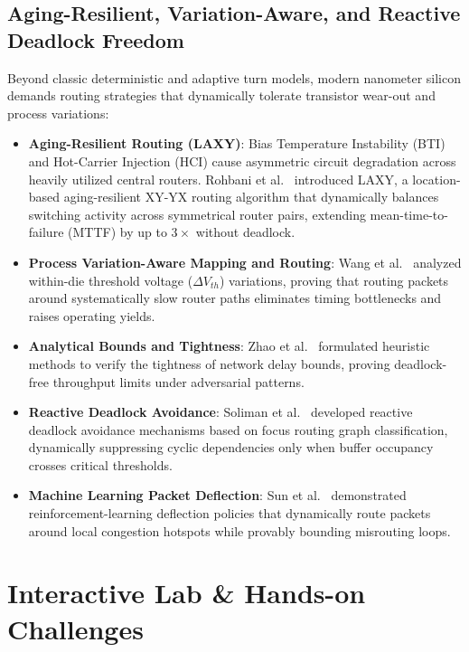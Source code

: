 \subsection{Aging-Resilient, Variation-Aware, and Reactive Deadlock Freedom}
\label{sec:ch5_aging_resilience}
Beyond classic deterministic and adaptive turn models, modern nanometer silicon demands routing strategies that dynamically tolerate transistor wear-out and process variations:
\begin{itemize}
    \item \textbf{Aging-Resilient Routing (LAXY)}: Bias Temperature Instability (BTI) and Hot-Carrier Injection (HCI) cause asymmetric circuit degradation across heavily utilized central routers. Rohbani et al.~\cite{Rohbani2017LAXY} introduced LAXY, a location-based aging-resilient XY-YX routing algorithm that dynamically balances switching activity across symmetrical router pairs, extending mean-time-to-failure (MTTF) by up to $3\times$ without deadlock.
    \item \textbf{Process Variation-Aware Mapping and Routing}: Wang et al.~\cite{Wang2011Variation} analyzed within-die threshold voltage ($\Delta V_{th}$) variations, proving that routing packets around systematically slow router paths eliminates timing bottlenecks and raises operating yields.
    \item \textbf{Analytical Bounds and Tightness}: Zhao et al.~\cite{Zhao2015Bounds} formulated heuristic methods to verify the tightness of network delay bounds, proving deadlock-free throughput limits under adversarial patterns.
    \item \textbf{Reactive Deadlock Avoidance}: Soliman et al.~\cite{Soliman2026RDA} developed reactive deadlock avoidance mechanisms based on focus routing graph classification, dynamically suppressing cyclic dependencies only when buffer occupancy crosses critical thresholds.
    \item \textbf{Machine Learning Packet Deflection}: Sun et al.~\cite{Sun2025ML} demonstrated reinforcement-learning deflection policies that dynamically route packets around local congestion hotspots while provably bounding misrouting loops.
\end{itemize}

\section{Interactive Lab \& Hands-on Challenges}
\label{sec:ch5_interactive}

